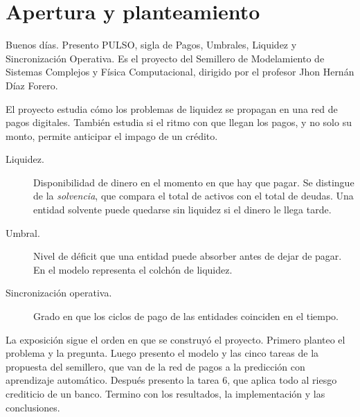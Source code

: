 \section{Apertura y planteamiento}

\begin{decir}
Buenos días. Presento PULSO, sigla de Pagos, Umbrales, Liquidez y Sincronización
Operativa. Es el proyecto del Semillero de Modelamiento de Sistemas Complejos y Física
Computacional, dirigido por el profesor Jhon Hernán Díaz Forero.

El proyecto estudia cómo los problemas de liquidez se propagan en una red de pagos
digitales. También estudia si el ritmo con que llegan los pagos, y no solo su monto,
permite anticipar el impago de un crédito.
\end{decir}
\begin{terminos}
\begin{description}
\item[Liquidez.] Disponibilidad de dinero en el momento en que hay que pagar. Se
distingue de la \emph{solvencia}, que compara el total de activos con el total de
deudas. Una entidad solvente puede quedarse sin liquidez si el dinero le llega tarde.
\item[Umbral.] Nivel de déficit que una entidad puede absorber antes de dejar de pagar.
En el modelo representa el colchón de liquidez.
\item[Sincronización operativa.] Grado en que los ciclos de pago de las entidades
coinciden en el tiempo.
\end{description}
\end{terminos}

\begin{decir}
La exposición sigue el orden en que se construyó el proyecto. Primero planteo el
problema y la pregunta. Luego presento el modelo y las cinco tareas de la propuesta del
semillero, que van de la red de pagos a la predicción con aprendizaje automático.
Después presento la tarea 6, que aplica todo al riesgo crediticio de un banco. Termino
con los resultados, la implementación y las conclusiones.
\end{decir}


